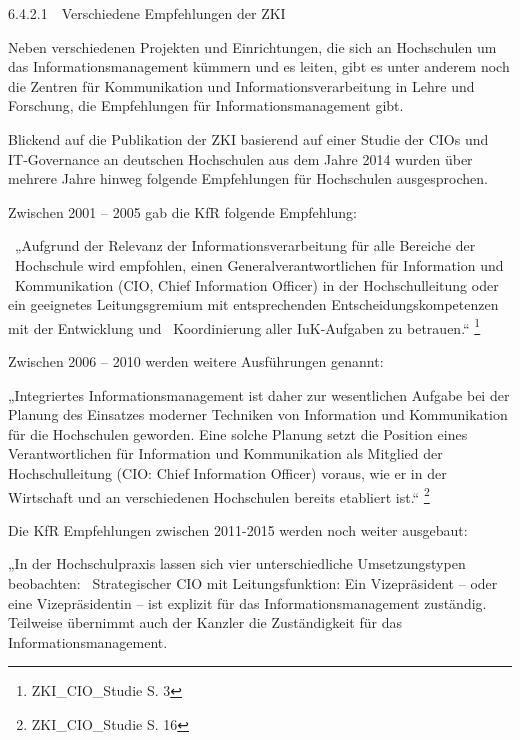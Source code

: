 \documentclass{article}
\begin{document}
\bigskip


\bigskip

\clearpage
\bigskip

6.4.2.1\ \  Verschiedene Empfehlungen der ZKI

Neben verschiedenen Projekten und Einrichtungen, die sich an Hochschulen um das Informationsmanagement kümmern und es
leiten, gibt es unter anderem noch die Zentren für Kommunikation und Informationsverarbeitung in Lehre und Forschung,
die Empfehlungen für Informationsmanagement gibt.

Blickend auf die Publikation der ZKI basierend auf einer Studie der CIOs und IT-Governance an deutschen Hochschulen aus
dem Jahre 2014 wurden über mehrere Jahre hinweg folgende Empfehlungen für Hochschulen ausgesprochen.\newline


Zwischen 2001 – 2005 gab die KfR folgende Empfehlung:

\ „Aufgrund der Relevanz der Informationsverarbeitung für alle Bereiche der \ Hochschule wird empfohlen, einen
Generalverantwortlichen für Information und \ Kommunikation (CIO, Chief Information Officer) in der Hochschulleitung
oder ein geeignetes Leitungsgremium mit entsprechenden Entscheidungskompetenzen mit der Entwicklung und \ Koordinierung
aller IuK-Aufgaben zu betrauen.“ \footnote{ZKI\_CIO\_Studie S. 3} 


\bigskip

Zwischen 2006 – 2010 werden weitere Ausführungen genannt: 

„Integriertes Informationsmanagement ist daher zur wesentlichen Aufgabe bei der Planung des Einsatzes moderner Techniken
von Information und Kommunikation für die Hochschulen geworden. Eine solche Planung setzt die Position eines
Verantwortlichen für Information und Kommunikation als Mitglied der Hochschulleitung (CIO: Chief Information Officer)
voraus, wie er in der Wirtschaft und an verschiedenen Hochschulen bereits etabliert ist.“ \footnote{ZKI\_CIO\_Studie S.
16}


\bigskip

Die KfR Empfehlungen zwischen 2011-2015 werden noch weiter ausgebaut:

„In der Hochschulpraxis lassen sich vier unterschiedliche Umsetzungstypen beobachten: \ Strategischer CIO mit
Leitungsfunktion: Ein Vizepräsident – oder eine Vizepräsidentin – ist explizit für das Informationsmanagement
zuständig. Teilweise übernimmt auch der Kanzler die Zuständigkeit für das Informationsmanagement. 
\end{document}
